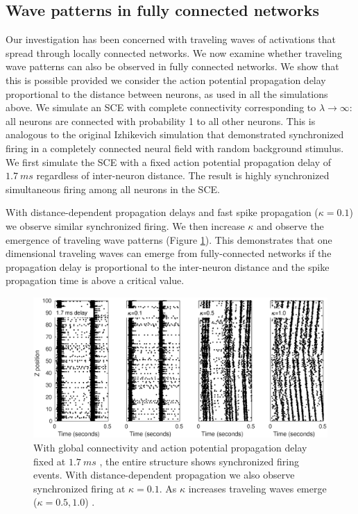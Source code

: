 \FloatBarrier

\subsection{Wave patterns in fully connected networks} \label{sub:delay}
Our investigation has been concerned with traveling waves of activations that spread through locally connected networks.
We now examine whether traveling wave patterns can also be observed in fully connected networks.
We show that this is possible provided we consider the action potential propagation delay proportional to the distance between neurons, as used in all the simulations above.
We simulate an SCE with complete connectivity corresponding to $\lambda \rightarrow \infty$: all neurons are connected with probability 1 to all other neurons.
This is analogous to the original Izhikevich simulation \citet{izhikevich2003} that demonstrated synchronized firing in a completely connected neural field with random background stimulus.
We first simulate the SCE with a fixed action potential propagation delay of $1.7~ms$ \citet{Markram1997}  regardless of inter-neuron distance.
The result is highly synchronized simultaneous firing among all neurons in the SCE.
 
With distance-dependent propagation delays and fast spike propagation ($\kappa=0.1$) we observe similar synchronized firing.
We then increase $\kappa$ and observe the emergence of traveling wave patterns (Figure \ref{fig:delay_waves}). 
This demonstrates that one dimensional traveling waves can emerge from fully-connected networks if the propagation delay is proportional to the inter-neuron distance and the spike propagation time is above a critical value.
\begin{figure}[!htb]
 \centering
   \includegraphics[width=\textwidth]{fig/DelayWaves}  
 \caption{With global connectivity and action potential propagation delay fixed at $1.7~ms$ , the entire structure shows synchronized firing events.
          With distance-dependent propagation we also observe synchronized firing at $\kappa=0.1$.
          As $\kappa$ increases traveling waves emerge ($\kappa=0.5, 1.0$) .}
 \label{fig:delay_waves}
\end{figure}

